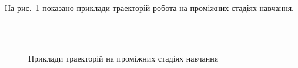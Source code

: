 На рис.~\ref{fig:samples-samples} показано приклади траекторій робота на проміжних стадіях навчання.

\begin{figure}
  \centering
  \,
   \\
  \,
  \caption{Приклади траекторій на проміжних стадіях навчання}
  \label{fig:samples-samples}
\end{figure}


